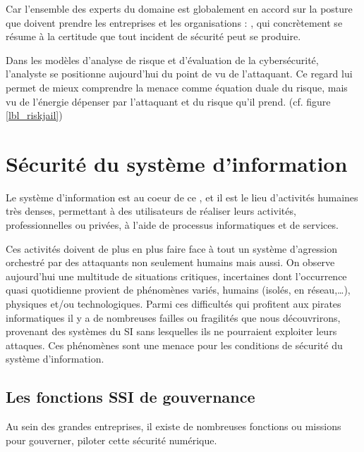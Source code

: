
 Car l'ensemble des experts du domaine est globalement en accord sur la posture que doivent prendre les entreprises et les organisations : , qui concrètement se résume à la certitude que tout incident de sécurité peut se produire.
 
Dans les modèles d'analyse de risque et d'évaluation de la cybersécurité, l'analyste se positionne aujourd'hui du point de vu de l'attaquant. Ce regard lui permet de mieux comprendre la menace comme équation duale du risque, mais vu de l'énergie dépenser par l'attaquant et du risque qu'il prend. (cf. figure \ref{lbl_riskjail})




\section{Sécurité du système d'information}

Le système d'information est au coeur de ce , et il est le lieu d'activités humaines très denses, permettant à des utilisateurs de réaliser leurs activités, professionnelles ou privées, à l'aide de processus informatiques et de services. 

Ces activités doivent de plus en plus faire face à tout un système d'agression orchestré par des attaquants non seulement humains mais aussi. On observe aujourd'hui une multitude de situations critiques, incertaines dont l'occurrence quasi quotidienne provient de phénomènes variés, humains (isolés, en réseau,…), physiques et/ou technologiques. Parmi ces difficultés qui profitent aux pirates informatiques il y a de nombreuses failles ou fragilités que nous découvrirons, provenant des systèmes du SI sans lesquelles ils ne pourraient exploiter leurs attaques. Ces phénomènes sont une menace pour les conditions de sécurité du système d'information.

\subsection{Les fonctions SSI de gouvernance}

Au sein des grandes entreprises, il existe de nombreuses fonctions ou missions pour gouverner, piloter cette sécurité numérique.

